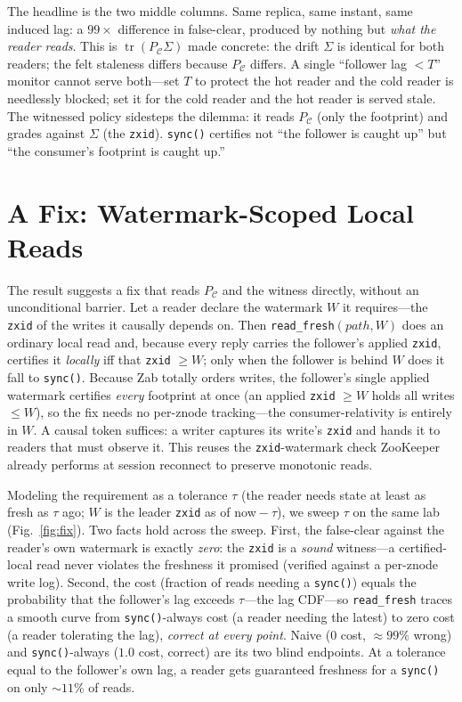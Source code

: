 \documentclass[conference]{IEEEtran}
\newcommand{\PC}{P_{\mathcal{C}}}
\newcommand{\tr}{\operatorname{tr}}
\begin{document}
The headline is the two middle columns. Same replica, same instant, same induced
lag: a $99\times$ difference in false-clear, produced by nothing but \emph{what
the reader reads}. This is $\tr(\PC\Sigma)$ made concrete: the drift $\Sigma$ is
identical for both readers; the felt staleness differs because $\PC$ differs. A
single ``follower lag $<T$'' monitor cannot serve both---set $T$ to protect the
hot reader and the cold reader is needlessly blocked; set it for the cold reader
and the hot reader is served stale. The witnessed policy sidesteps the dilemma:
it reads $\PC$ (only the footprint) and grades against $\Sigma$ (the
\texttt{zxid}). \texttt{sync()} certifies not ``the follower is caught up'' but
``the consumer's footprint is caught up.''

\section{A Fix: Watermark-Scoped Local Reads}\label{sec:fix}
The result suggests a fix that reads $\PC$ and the witness directly, without an
unconditional barrier. Let a reader declare the watermark $W$ it requires---the
\texttt{zxid} of the writes it causally depends on. Then
\texttt{read\_fresh}$(\mathit{path},W)$ does an ordinary local read and, because
every reply carries the follower's applied \texttt{zxid}, certifies it
\emph{locally} iff that \texttt{zxid} $\ge W$; only when the follower is behind
$W$ does it fall to \texttt{sync()}. Because Zab totally orders writes, the
follower's single applied watermark certifies \emph{every} footprint at once (an
applied \texttt{zxid} $\ge W$ holds all writes $\le W$), so the fix needs no
per-znode tracking---the consumer-relativity is entirely in $W$. A causal token
suffices: a writer captures its write's \texttt{zxid} and hands it to readers
that must observe it. This reuses the \texttt{zxid}-watermark check ZooKeeper
already performs at session reconnect to preserve monotonic reads.

Modeling the requirement as a tolerance $\tau$ (the reader needs state at least
as fresh as $\tau$ ago; $W$ is the leader \texttt{zxid} as of now${}-\tau$), we
sweep $\tau$ on the same lab (Fig.~\ref{fig:fix}). Two facts hold across the
sweep. First, the false-clear against the reader's own watermark is exactly
\emph{zero}: the \texttt{zxid} is a \emph{sound} witness---a certified-local read
never violates the freshness it promised (verified against a per-znode write
log). Second, the cost (fraction of reads needing a \texttt{sync()}) equals the
probability that the follower's lag exceeds $\tau$---the lag CDF---so
\texttt{read\_fresh} traces a smooth curve from \texttt{sync()}-always cost (a
reader needing the latest) to zero cost (a reader tolerating the lag),
\emph{correct at every point}. Naive ($0$ cost, ${\approx}99\%$ wrong) and
\texttt{sync()}-always ($1.0$ cost, correct) are its two blind endpoints. At a
tolerance equal to the follower's own lag, a reader gets guaranteed freshness for
a \texttt{sync()} on only ${\sim}11\%$ of reads.
\end{document}
